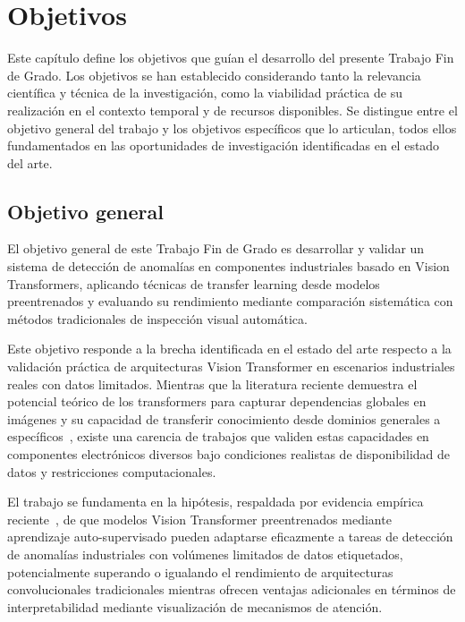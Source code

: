 \chapter{Objetivos}
\label{ch:objetivos}

Este capítulo define los objetivos que guían el desarrollo del presente Trabajo Fin de Grado. Los objetivos se han establecido considerando tanto la relevancia científica y técnica de la investigación, como la viabilidad práctica de su realización en el contexto temporal y de recursos disponibles. Se distingue entre el objetivo general del trabajo y los objetivos específicos que lo articulan, todos ellos fundamentados en las oportunidades de investigación identificadas en el estado del arte.

\section{Objetivo general}

El objetivo general de este Trabajo Fin de Grado es desarrollar y validar un sistema de detección de anomalías en componentes industriales basado en Vision Transformers, aplicando técnicas de transfer learning desde modelos preentrenados y evaluando su rendimiento mediante comparación sistemática con métodos tradicionales de inspección visual automática.

Este objetivo responde a la brecha identificada en el estado del arte respecto a la validación práctica de arquitecturas Vision Transformer en escenarios industriales reales con datos limitados. Mientras que la literatura reciente demuestra el potencial teórico de los transformers para capturar dependencias globales en imágenes y su capacidad de transferir conocimiento desde dominios generales a específicos~\cite{huang2025semiconductor,zhang2025exploring}, existe una carencia de trabajos que validen estas capacidades en componentes electrónicos diversos bajo condiciones realistas de disponibilidad de datos y restricciones computacionales.

El trabajo se fundamenta en la hipótesis, respaldada por evidencia empírica reciente~\cite{huang2025semiconductor}, de que modelos Vision Transformer preentrenados mediante aprendizaje auto-supervisado pueden adaptarse eficazmente a tareas de detección de anomalías industriales con volúmenes limitados de datos etiquetados, potencialmente superando o igualando el rendimiento de arquitecturas convolucionales tradicionales mientras ofrecen ventajas adicionales en términos de interpretabilidad mediante visualización de mecanismos de atención.


